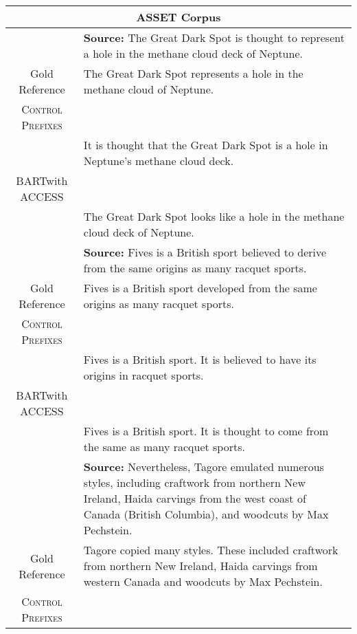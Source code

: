 \documentclass[11pt]{article}
\newcommand{\control}{\textsc{Control Prefixes}\xspace}
\newcommand{\bartl}{BART}
\begin{document}
\begin{table*}[bth!]
\scriptsize
  \centering
  \renewcommand{\arraystretch}{1.3}
  \begin{tabular}{c|p{}}
  \hline
 
  \multicolumn{2}{c}{\textbf{ASSET Corpus}} \\ \hline
 & \textbf{Source:} The Great Dark Spot is thought to represent a hole in the methane cloud deck of Neptune. \\ \hline

  
Gold Reference
& The Great Dark Spot represents a hole in the methane cloud of Neptune. \\ \hline
\control  \\
& It is thought that the Great Dark Spot is a hole in Neptune's methane cloud deck.\\ \hline
\bartl with ACCESS \\

& The Great Dark Spot looks like a hole in the methane cloud deck of Neptune.
\\ \midrule \hline

 & \textbf{Source:} Fives is a British sport believed to derive from the same origins as many racquet sports. \\ \hline

  
Gold Reference
& Fives is a British sport developed from the same origins as many racquet sports. \\ \hline
\control \\


& Fives is a British sport. It is believed to have its origins in racquet sports.\\ \hline
\bartl with ACCESS \\

& Fives is a British sport. It is thought to come from the same as many racquet sports.
\\ \midrule \hline

 & \textbf{Source:} Nevertheless, Tagore emulated numerous styles, including craftwork from northern New Ireland, Haida carvings from the west coast of Canada (British Columbia), and woodcuts by Max Pechstein. \\ \hline

  
Gold Reference
& Tagore copied many styles. These included craftwork from northern New Ireland, Haida carvings from western Canada and woodcuts by Max Pechstein. \\ \hline
\control\\



\end{tabular}
\end{table*}
\end{document}
